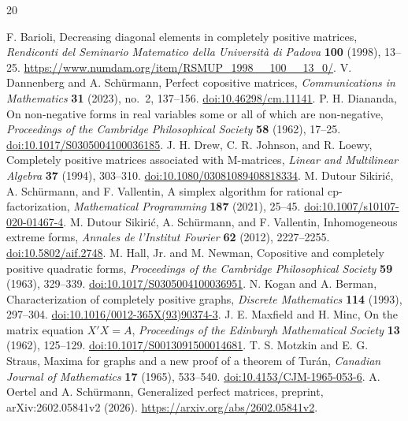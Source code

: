 \begin{thebibliography}{20}\raggedright
{} F. Barioli, Decreasing diagonal elements in completely positive matrices, \emph{Rendiconti del Seminario Matematico della Universit\`a di Padova} \textbf{100} (1998), 13--25. \url{https://www.numdam.org/item/RSMUP_1998__100__13_0/}.
 V. Dannenberg and A. Sch\"urmann, Perfect copositive matrices, \emph{Communications in Mathematics} \textbf{31} (2023), no.~2, 137--156. \href{https://doi.org/10.46298/cm.11141}{doi:10.46298/cm.11141}.
 P. H. Diananda, On non-negative forms in real variables some or all of which are non-negative, \emph{Proceedings of the Cambridge Philosophical Society} \textbf{58} (1962), 17--25. \href{https://doi.org/10.1017/S0305004100036185}{doi:10.1017/S0305004100036185}.
 J. H. Drew, C. R. Johnson, and R. Loewy, Completely positive matrices associated with M-matrices, \emph{Linear and Multilinear Algebra} \textbf{37} (1994), 303--310. \href{https://doi.org/10.1080/03081089408818334}{doi:10.1080/03081089408818334}.
 M. Dutour Sikiri\'c, A. Sch\"urmann, and F. Vallentin, A simplex algorithm for rational cp-factorization, \emph{Mathematical Programming} \textbf{187} (2021), 25--45. \href{https://doi.org/10.1007/s10107-020-01467-4}{doi:10.1007/s10107-020-01467-4}.
 M. Dutour Sikiri\'c, A. Sch\"urmann, and F. Vallentin, Inhomogeneous extreme forms, \emph{Annales de l'Institut Fourier} \textbf{62} (2012), 2227--2255. \href{https://doi.org/10.5802/aif.2748}{doi:10.5802/aif.2748}.
 M. Hall, Jr. and M. Newman, Copositive and completely positive quadratic forms, \emph{Proceedings of the Cambridge Philosophical Society} \textbf{59} (1963), 329--339. \href{https://doi.org/10.1017/S0305004100036951}{doi:10.1017/S0305004100036951}.
 N. Kogan and A. Berman, Characterization of completely positive graphs, \emph{Discrete Mathematics} \textbf{114} (1993), 297--304. \href{https://doi.org/10.1016/0012-365X(93)90374-3}{doi:10.1016/0012-365X(93)90374-3}.
 J. E. Maxfield and H. Minc, On the matrix equation $X'X=A$, \emph{Proceedings of the Edinburgh Mathematical Society} \textbf{13} (1962), 125--129. \href{https://doi.org/10.1017/S0013091500014681}{doi:10.1017/S0013091500014681}.
 T. S. Motzkin and E. G. Straus, Maxima for graphs and a new proof of a theorem of Tur\'an, \emph{Canadian Journal of Mathematics} \textbf{17} (1965), 533--540. \href{https://doi.org/10.4153/CJM-1965-053-6}{doi:10.4153/CJM-1965-053-6}.
 A. Oertel and A. Sch\"urmann, Generalized perfect matrices, preprint, arXiv:2602.05841v2 (2026). \url{https://arxiv.org/abs/2602.05841v2}.

\end{thebibliography}
